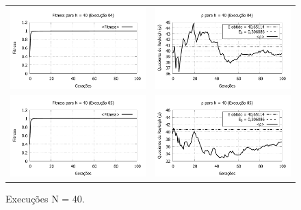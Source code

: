 \begin{figure}[phtb]
\begin{tabular}{@{}cc@{}}
		\includegraphics[width=.40\textwidth]{figs/resultados/N40_04_fitness.pdf} &
    \includegraphics[width=.40\textwidth]{figs/resultados/N40_04_rho.pdf}   \\
		\includegraphics[width=.40\textwidth]{figs/resultados/N40_05_fitness.pdf} &
    \includegraphics[width=.40\textwidth]{figs/resultados/N40_05_rho.pdf}
  \end{tabular}
  \caption{Execuções N = 40.}
	\label{fig:execucoes_N40}
\end{figure}

